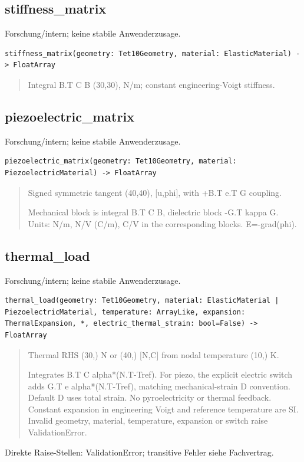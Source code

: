 \subsection{stiffness\_matrix}
Forschung/intern; keine stabile Anwenderzusage.
\begin{lstlisting}
stiffness_matrix(geometry: Tet10Geometry, material: ElasticMaterial) -> FloatArray
\end{lstlisting}
\begin{quote}
Integral B.T C B (30,30), N/m; constant engineering-Voigt stiffness.
\end{quote}
\subsection{piezoelectric\_matrix}
Forschung/intern; keine stabile Anwenderzusage.
\begin{lstlisting}
piezoelectric_matrix(geometry: Tet10Geometry, material: PiezoelectricMaterial) -> FloatArray
\end{lstlisting}
\begin{quote}
Signed symmetric tangent (40,40), [u,phi], with +B.T e.T G coupling.\par Mechanical block is integral B.T C B, dielectric block -G.T kappa G. Units: N/m, N/V (C/m), C/V in the corresponding blocks. E=-grad(phi).
\end{quote}
\subsection{thermal\_load}
Forschung/intern; keine stabile Anwenderzusage.
\begin{lstlisting}
thermal_load(geometry: Tet10Geometry, material: ElasticMaterial | PiezoelectricMaterial, temperature: ArrayLike, expansion: ThermalExpansion, *, electric_thermal_strain: bool=False) -> FloatArray
\end{lstlisting}
\begin{quote}
Thermal RHS (30,) N or (40,) [N,C] from nodal temperature (10,) K.\par Integrates B.T C alpha*(N.T-Tref). For piezo, the explicit electric switch adds G.T e alpha*(N.T-Tref), matching mechanical-strain D convention. Default D uses total strain. No pyroelectricity or thermal feedback. Constant expansion in engineering Voigt and reference temperature are SI. Invalid geometry, material, temperature, expansion or switch raise ValidationError.
\end{quote}
Direkte Raise-Stellen: ValidationError; transitive Fehler siehe Fachvertrag.
